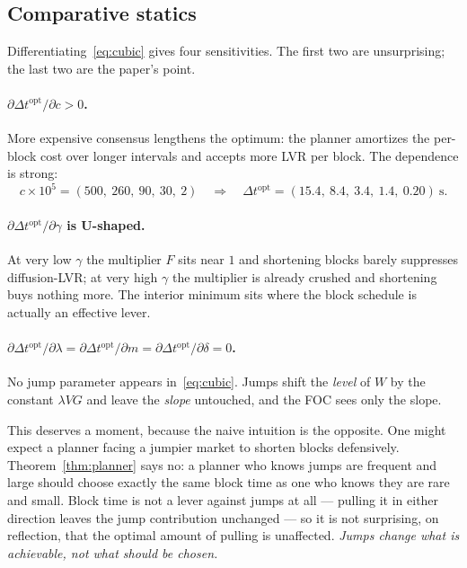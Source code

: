 \documentclass[11pt]{article}
\theoremstyle{definition}
\theoremstyle{remark}
\newcommand{\dt}{\Delta t}
\newcommand{\1}{\mathbf{1}}
\begin{document}
\subsection{Comparative statics}

Differentiating~\eqref{eq:cubic} gives four sensitivities. The first two are unsurprising; the last two are the paper's point.

\paragraph{$\partial\dt^{\mathrm{opt}}/\partial c > 0$.} More expensive consensus lengthens the optimum: the planner amortizes the per-block cost over longer intervals and accepts more LVR per block. The dependence is strong:
\[
c\times10^{5} = (500,\ 260,\ 90,\ 30,\ 2)
\quad\Longrightarrow\quad
\dt^{\mathrm{opt}} = (15.4,\ 8.4,\ 3.4,\ 1.4,\ 0.20)\ \text{s}.
\]

\paragraph{$\partial\dt^{\mathrm{opt}}/\partial\gamma$ is U-shaped.} At very low $\gamma$ the multiplier $F$ sits near $1$ and shortening blocks barely suppresses diffusion-LVR; at very high $\gamma$ the multiplier is already crushed and shortening buys nothing more. The interior minimum sits where the block schedule is actually an effective lever.

\paragraph{$\partial\dt^{\mathrm{opt}}/\partial\lambda = \partial\dt^{\mathrm{opt}}/\partial m = \partial\dt^{\mathrm{opt}}/\partial\delta = 0$.}
No jump parameter appears in~\eqref{eq:cubic}. Jumps shift the \emph{level} of $W$ by the constant $\lambda VG$ and leave the \emph{slope} untouched, and the FOC sees only the slope.

This deserves a moment, because the naive intuition is the opposite. One might expect a planner facing a jumpier market to shorten blocks defensively. Theorem~\ref{thm:planner} says no: a planner who knows jumps are frequent and large should choose exactly the same block time as one who knows they are rare and small. Block time is not a lever against jumps at all --- pulling it in either direction leaves the jump contribution unchanged --- so it is not surprising, on reflection, that the optimal amount of pulling is unaffected. \emph{Jumps change what is achievable, not what should be chosen.}
\end{document}
